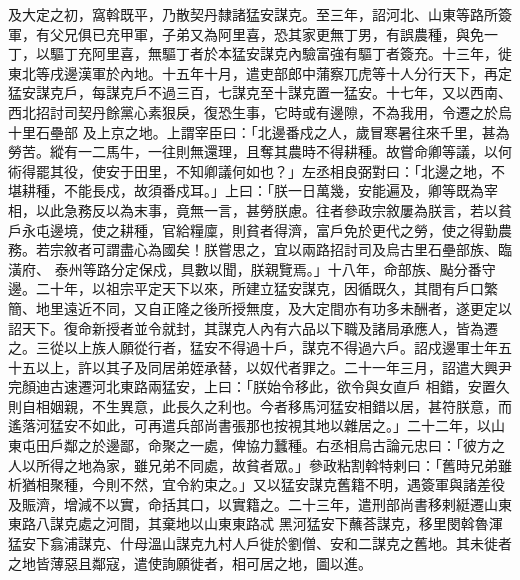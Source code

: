 \begin{pinyinscope}
 及大定之初，窩斡既平，乃散契丹隸諸猛安謀克。至三年，詔河北、山東等路所簽軍，有父兄俱已充甲軍，子弟又為阿里喜，恐其家更無丁男，有誤農種，與免一丁，以驅丁充阿里喜，無驅丁者於本猛安謀克內驗富強有驅丁者簽充。十三年，徙東北等戌邊漢軍於內地。十五年十月，遣吏部郎中蒲察兀虎等十人分行天下，再定猛安謀克戶，每謀克戶不過三百，七謀克至十謀克置一猛安。十七年，又以西南、西北招討司契丹餘黨心素狠戾，復恐生事，它時或有邊隙，不為我用，令遷之於烏十里石壘部
 及上京之地。上謂宰臣曰：「北邊番戍之人，歲冒寒暑往來千里，甚為勞苦。縱有一二馬牛，一往則無還理，且奪其農時不得耕種。故嘗命卿等議，以何術得罷其役，使安于田里，不知卿議何如也？」左丞相良弼對曰：「北邊之地，不堪耕種，不能長戍，故須番戍耳。」上曰：「朕一日萬幾，安能遍及，卿等既為宰相，以此急務反以為末事，竟無一言，甚勞朕慮。往者參政宗敘屢為朕言，若以貧戶永屯邊境，使之耕種，官給糧廩，則貧者得濟，富戶免於更代之勞，使之得勤農務。若宗敘者可謂盡心為國矣！朕嘗思之，宜以兩路招討司及烏古里石壘部族、臨潢府、
 泰州等路分定保戍，具數以聞，朕親覽焉。」十八年，命部族、颭分番守邊。二十年，以祖宗平定天下以來，所建立猛安謀克，因循既久，其間有戶口繁簡、地里遠近不同，又自正隆之後所授無度，及大定間亦有功多未酬者，遂更定以詔天下。復命新授者並令就封，其謀克人內有六品以下職及諸局承應人，皆為遷之。三從以上族人願從行者，猛安不得過十戶，謀克不得過六戶。詔戍邊軍士年五十五以上，許以其子及同居弟姪承替，以奴代者罪之。二十一年三月，詔遣大興尹完顏迪古速遷河北東路兩猛安，上曰：「朕始令移此，欲令與女直戶
 相錯，安置久則自相姻親，不生異意，此長久之利也。今者移馬河猛安相錯以居，甚符朕意，而遙落河猛安不如此，可再遣兵部尚書張那也按視其地以雜居之。」二十二年，以山東屯田戶鄰之於邊鄙，命聚之一處，俾協力蠶種。右丞相烏古論元忠曰：「彼方之人以所得之地為家，雖兄弟不同處，故貧者眾。」參政粘割斡特剌曰：「舊時兄弟雖析猶相聚種，今則不然，宜令約束之。」又以猛安謀克舊籍不明，遇簽軍與諸差役及賑濟，增減不以實，命括其口，以實籍之。二十三年，遣刑部尚書移剌綎遷山東東路八謀克處之河間，其棄地以山東東路忒
 黑河猛安下蘸荅謀克，移里閔斡魯渾猛安下翕浦謀克、什母溫山謀克九村人戶徙於劉僧、安和二謀克之舊地。其未徙者之地皆薄惡且鄰寇，遣使詢願徙者，相可居之地，圖以進。




\end{pinyinscope}
